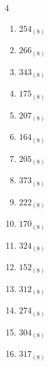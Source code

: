 \begin{multicols}{4}
\begin{enumerate}
  \item $254_{(8)}$

        \phantom{$=172$}

  \item $266_{(8)}$

        \phantom{$=182$}

  \item $343_{(8)}$

        \phantom{$=227$}

  \item $175_{(8)}$

        \phantom{$=125$}

\columnbreak %

  \item $207_{(8)}$

        \phantom{$=135$}

  \item $164_{(8)}$

        \phantom{$=116$}

  \item $205_{(8)}$

        \phantom{$=133$}

  \item $373_{(8)}$

        \phantom{$=251$}

  \item $222_{(8)}$

        \phantom{$=146$}

  \item $170_{(8)}$

        \phantom{$=120$}

  \item $324_{(8)}$

        \phantom{$=212$}

  \item $152_{(8)}$

        \phantom{$=106$}

  \item $312_{(8)}$

        \phantom{$=202$}

  \item $274_{(8)}$

        \phantom{$=188$}

  \item $304_{(8)}$

        \phantom{$=196$}

  \item $317_{(8)}$


\end{enumerate}
\end{multicols}
